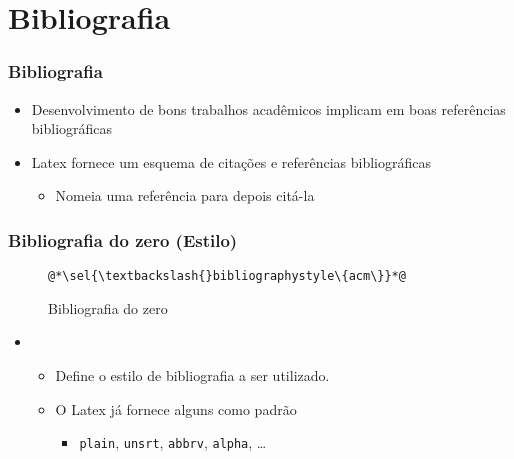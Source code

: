 \section{Bibliografia}

\begin{frame}[fragile] \frametitle{Bibliografia}
\begin{itemize}
	\item Desenvolvimento de bons trabalhos acadêmicos implicam em boas referências bibliográficas
	\item Latex fornece um esquema de citações e referências bibliográficas
	\begin{itemize}
		\item Nomeia uma referência para depois citá-la
	\end{itemize}
\end{itemize}
\end{frame}

\begin{frame}[fragile] \frametitle{Bibliografia do zero (Estilo)}
\vspace{-0.5cm}
\begin{figure}[!t]
\caption{Bibliografia do zero}
\begin{lstlisting}
@*\sel{\textbackslash{}bibliographystyle\{acm\}}*@

\end{lstlisting}
\ownsrc
\end{figure}

\begin{itemize}
	\item {}
	\begin{itemize}
		\item Define o estilo de bibliografia a ser utilizado.
		\item O Latex já fornece alguns como padrão
		\begin{itemize}
			\item \texttt{plain}, \texttt{unsrt}, \texttt{abbrv}, \texttt{alpha}, \ldots
		\end{itemize}
	\end{itemize}
\end{itemize}
\end{frame}

